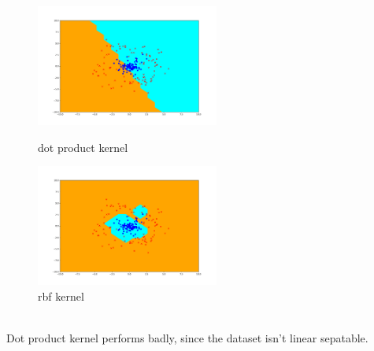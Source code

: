 \begin{answer}
    \begin{figure}[htbp]
        \centering
        \begin{minipage}[t]{0.48\textwidth}
            \centering
            \includegraphics[width=6cm]{../src/output/p05_dot_output.pdf}
            \caption{dot product kernel}
        \end{minipage}
        \centering
        \begin{minipage}[t]{0.48\textwidth}
            \centering
            \includegraphics[width=6cm]{../src/output/p05_rbf_output.pdf}
            \caption{rbf kernel}
        \end{minipage}
    \end{figure}\\

    Dot product kernel performs badly, since the dataset isn't linear sepatable.
\end{answer}
